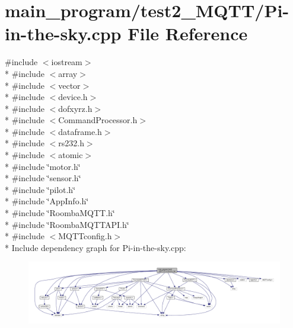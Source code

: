 \hypertarget{test2___m_q_t_t_2_pi-in-the-sky_8cpp}{}\section{main\+\_\+program/test2\+\_\+\+M\+Q\+T\+T/\+Pi-\/in-\/the-\/sky.cpp File Reference}
\label{test2___m_q_t_t_2_pi-in-the-sky_8cpp}
{\ttfamily \#include $<$iostream$>$}\\*
{\ttfamily \#include $<$array$>$}\\*
{\ttfamily \#include $<$vector$>$}\\*
{\ttfamily \#include $<$device.\+h$>$}\\*
{\ttfamily \#include $<$dofxyrz.\+h$>$}\\*
{\ttfamily \#include $<$Command\+Processor.\+h$>$}\\*
{\ttfamily \#include $<$dataframe.\+h$>$}\\*
{\ttfamily \#include $<$rs232.\+h$>$}\\*
{\ttfamily \#include $<$atomic$>$}\\*
{\ttfamily \#include \char`\"{}motor.\+h\char`\"{}}\\*
{\ttfamily \#include \char`\"{}sensor.\+h\char`\"{}}\\*
{\ttfamily \#include \char`\"{}pilot.\+h\char`\"{}}\\*
{\ttfamily \#include \char`\"{}App\+Info.\+h\char`\"{}}\\*
{\ttfamily \#include \char`\"{}Roomba\+M\+Q\+T\+T.\+h\char`\"{}}\\*
{\ttfamily \#include \char`\"{}Roomba\+M\+Q\+T\+T\+A\+P\+I.\+h\char`\"{}}\\*
{\ttfamily \#include $<$M\+Q\+T\+Tconfig.\+h$>$}\\*
Include dependency graph for Pi-\/in-\/the-\/sky.cpp\+:
\nopagebreak
\begin{figure}[H]
\begin{center}
\leavevmode
\includegraphics[width=350pt]{test2___m_q_t_t_2_pi-in-the-sky_8cpp__incl}
\end{center}
\end{figure}
